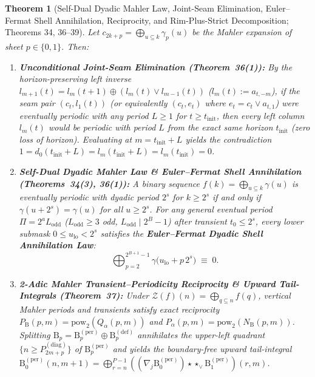 \documentclass[11pt,a4paper]{article}
\newtheorem{theorem}{Theorem}[section]
\theoremstyle{definition}
\theoremstyle{remark}
\newcommand{\powtwo}{\mathrm{pow}_2}
\begin{document}
\begin{theorem}[Self-Dual Dyadic Mahler Law, Joint-Seam Elimination, Euler--Fermat Shell Annihilation, Reciprocity, and Rim-Plus-Strict Decomposition; Theorems 34, 36--39]\label{thm:mahler_laws}
Let $c_{2k+p} = \bigoplus_{u \subseteq k} \gamma_p(u)$ be the Mahler expansion of sheet $p \in \{0,1\}$. Then:
\begin{enumerate}
  \item \textbf{Unconditional Joint-Seam Elimination (Theorem~36(1)):} By the horizon-preserving left inverse $l_{m+1}(t) = l_m(t+1) \oplus (l_m(t) \lor l_{m-1}(t))$ ($l_m(t) := a_{t,-m}$), if the seam pair $(c_t, l_1(t))$ (or equivalently $(c_t, e_t)$ where $e_t = c_t \lor a_{t,1}$) were eventually periodic with any period $L \ge 1$ for $t \ge t_{\mathrm{init}}$, then every left column $l_m(t)$ would be periodic with period $L$ from the exact same horizon $t_{\mathrm{init}}$ (zero loss of horizon). Evaluating at $m = t_{\mathrm{init}} + L$ yields the contradiction $1 = d_0(t_{\mathrm{init}}+L) = l_m(t_{\mathrm{init}}+L) = l_m(t_{\mathrm{init}}) = 0$.
  \item \textbf{Self-Dual Dyadic Mahler Law \& Euler--Fermat Shell Annihilation (Theorems~34(3), 36(1)):} A binary sequence $f(k) = \bigoplus_{u \subseteq k} \gamma(u)$ is eventually periodic with dyadic period $2^s$ for $k \ge 2^s$ if and only if $\gamma(u + 2^s) = \gamma(u)$ for all $u \ge 2^s$. For any general eventual period $\Pi = 2^a L_{\mathrm{odd}}$ ($L_{\mathrm{odd}} \ge 3$ odd, $L_{\mathrm{odd}} \mid 2^B - 1$) after transient $t_0 \le 2^s$, every lower submask $0 \le u_{\mathrm{lo}} < 2^s$ satisfies the \textbf{Euler--Fermat Dyadic Shell Annihilation Law}:
  \begin{equation}
    \bigoplus_{p=2}^{2^{B+1}-1} \gamma\bigl(u_{\mathrm{lo}} + p\,2^s\bigr) \;\equiv\; 0.
  \end{equation}
  \item \textbf{2-Adic Mahler Transient--Periodicity Reciprocity \& Upward Tail-Integrals (Theorem~37):} Under $\mathcal{Z}(f)(n) = \bigoplus_{q \subseteq n} f(q)$, vertical Mahler periods and transients satisfy exact reciprocity $P_{\mathrm{B}}(p,m) = \powtwo(Q_\alpha(p,m))$ and $P_\alpha(p,m) = \powtwo(N_{\mathrm{B}}(p,m))$. Splitting $\mathrm{B}_p = \mathrm{B}_p^{(\mathrm{per})} \oplus \mathrm{B}_p^{(\mathrm{def})}$ annihilates the upper-left quadrant $\{n \ge P_{2m+p}^{(\mathrm{diag})}\}$ of $\mathrm{B}_p^{(\mathrm{per})}$ and yields the boundary-free upward tail-integral $\mathrm{B}_0^{(\mathrm{per})}(n,m+1) = \bigoplus_{r=n}^{P-1} ((\nabla_j \mathrm{B}_0^{(\mathrm{per})}) \star\star_{\lor} \mathrm{B}_1^{(\mathrm{per})})(r,m)$.

\end{enumerate}
\end{theorem}
\end{document}
